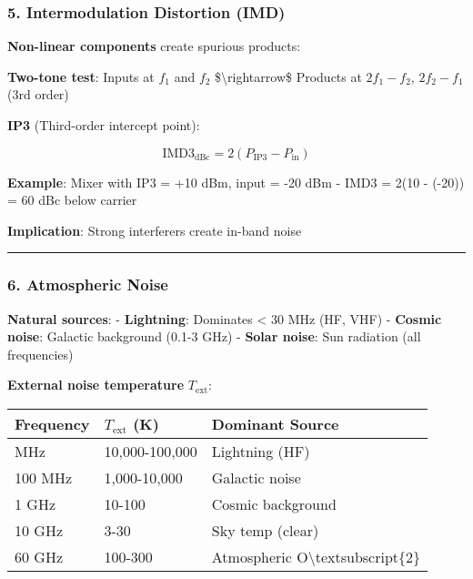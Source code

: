 \subsubsection{5. Intermodulation Distortion
(IMD)}\label{intermodulation-distortion-imd}

\textbf{Non-linear components} create spurious products:

\textbf{Two-tone test}: Inputs at \(f_1\) and \(f_2\)
\$\textbackslash rightarrow\$ Products at \(2f_1 - f_2\), \(2f_2 - f_1\)
(3rd order)

\textbf{IP3} (Third-order intercept point):

\[
\text{IMD3}_{\text{dBc}} = 2(P_{\text{IP3}} - P_{\text{in}})
\]

\textbf{Example}: Mixer with IP3 = +10 dBm, input = -20 dBm - IMD3 =
2(10 - (-20)) = 60 dBc below carrier

\textbf{Implication}: Strong interferers create in-band noise

\begin{center}\rule{0.5\linewidth}{0.5pt}\end{center}

\subsubsection{6. Atmospheric Noise}\label{atmospheric-noise}

\textbf{Natural sources}: - \textbf{Lightning}: Dominates \textless{} 30
MHz (HF, VHF) - \textbf{Cosmic noise}: Galactic background (0.1-3 GHz) -
\textbf{Solar noise}: Sun radiation (all frequencies)

\textbf{External noise temperature} \(T_{\text{ext}}\):

{\def\LTcaptype{} %
\begin{longtable}[]{@{}lll@{}}
\toprule\noalign{}
Frequency & \(T_{\text{ext}}\) (K) & Dominant Source \\
\midrule\noalign{}
\endhead
\bottomrule\noalign{}
\endlastfoot
10 MHz & 10,000-100,000 & Lightning (HF) \\
100 MHz & 1,000-10,000 & Galactic noise \\
1 GHz & 10-100 & Cosmic background \\
10 GHz & 3-30 & Sky temp (clear) \\
60 GHz & 100-300 & Atmospheric O\textbackslash textsubscript\{2\} \\
\end{longtable}
}

